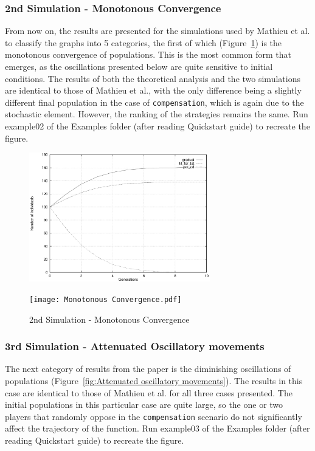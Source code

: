 \subsubsection{2nd Simulation - Monotonous Convergence}
From now on, the results are presented for the simulations used by Mathieu et al. to classify the graphs into 5 categories, the first of which (Figure~\ref{fig:Monotonous Convergence}) is the monotonous convergence of populations. This is the most common form that emerges, as the oscillations presented below are quite sensitive to initial conditions. The results of both the theoretical analysis and the two simulations are identical to those of Mathieu et al., with the only difference being a slightly different final population in the case of \texttt{compensation}, which is again due to the stochastic element. However, the ranking of the strategies remains the same. Run example02 of the Examples folder (after reading Quickstart guide) to recreate the figure.

	\begin{figure}[h]
	    \centering
		\includegraphics[width=0.7\textwidth]{RefPaperFigures/fig2.jpeg}\par\vspace{0.5em}
	    \texttt{[image: Monotonous Convergence.pdf]}
	    \caption{2nd Simulation - Monotonous Convergence}
	    \label{fig:Monotonous Convergence}
	\end{figure}
\subsubsection{3rd Simulation - Attenuated Oscillatory movements}
The next category of results from the paper is the diminishing oscillations of populations (Figure~\ref{fig:Attenuated oscillatory movements}). The results in this case are identical to those of Mathieu et al. for all three cases presented. The initial populations in this particular case are quite large, so the one or two players that randomly oppose in the \texttt{compensation} scenario do not significantly affect the trajectory of the function. Run example03 of the Examples folder (after reading Quickstart guide) to recreate the figure.

